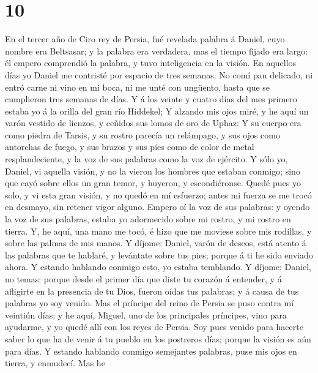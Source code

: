 \hypertarget{section-9}{%
\section{10}\label{section-9}}

 En el tercer año de Ciro rey de Persia, fué revelada
palabra á Daniel, cuyo nombre era Beltsasar; y la palabra era verdadera,
mas el tiempo fijado era largo: él empero comprendió la palabra, y tuvo
inteligencia en la visión.  En aquellos días yo Daniel me
contristé por espacio de tres semanas.  No comí pan
delicado, ni entró carne ni vino en mi boca, ni me unté con ungüento,
hasta que se cumplieron tres semanas de días.  Y á los
veinte y cuatro días del mes primero estaba yo á la orilla del gran río
Hiddekel;  Y alzando mis ojos miré, y he aquí un varón
vestido de lienzos, y ceñidos sus lomos de oro de Uphaz: 
Y su cuerpo era como piedra de Tarsis, y su rostro parecía un relámpago,
y sus ojos como antorchas de fuego, y sus brazos y sus pies como de
color de metal resplandeciente, y la voz de sus palabras como la voz de
ejército.  Y sólo yo, Daniel, vi aquella visión, y no la
vieron los hombres que estaban conmigo; sino que cayó sobre ellos un
gran temor, y huyeron, y escondiéronse.  Quedé pues yo
solo, y vi esta gran visión, y no quedó en mí esfuerzo; antes mi fuerza
se me trocó en desmayo, sin retener vigor alguno.  Empero
oí la voz de sus palabras: y oyendo la voz de sus palabras, estaba yo
adormecido sobre mi rostro, y mi rostro en tierra.  Y, he
aquí, una mano me tocó, é hizo que me moviese sobre mis rodillas, y
sobre las palmas de mis manos.  Y díjome: Daniel, varón
de deseos, está atento á las palabras que te hablaré, y levántate sobre
tus pies; porque á ti he sido enviado ahora. Y estando hablando conmigo
esto, yo estaba temblando.  Y díjome: Daniel, no temas:
porque desde el primer día que diste tu corazón á entender, y á
afligirte en la presencia de tu Dios, fueron oídas tus palabras; y á
causa de tus palabras yo soy venido.  Mas el príncipe del
reino de Persia se puso contra mí veintiún días: y he aquí, Miguel, uno
de los principales príncipes, vino para ayudarme, y yo quedé allí con
los reyes de Persia.  Soy pues venido para hacerte saber
lo que ha de venir á tu pueblo en los postreros días; porque la visión
es aún para días.  Y estando hablando conmigo semejantes
palabras, puse mis ojos en tierra, y enmudecí.  Mas he
